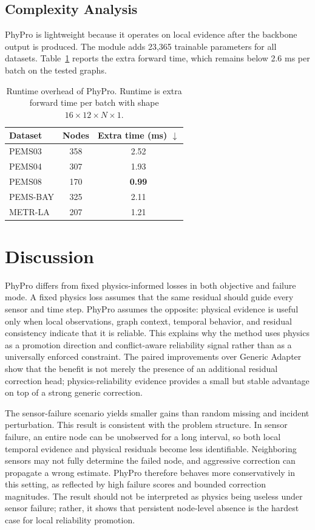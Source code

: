 \documentclass[preprint,12pt]{elsarticle}
\begin{document}
\subsection{Complexity Analysis}
PhyPro is lightweight because it operates on local evidence after the backbone output is produced. The module adds 23,365 trainable parameters for all datasets. Table~\ref{tab:complexity} reports the extra forward time, which remains below 2.6 ms per batch on the tested graphs.

\begin{table}[!htbp]
\centering
\small
\caption{Runtime overhead of PhyPro. Runtime is extra forward time per batch with shape $16{\times}12{\times}N{\times}1$.}
\label{tab:complexity}
\begin{tabular}{lcc}
\toprule
Dataset & Nodes & Extra time (ms) $\downarrow$ \\
\midrule
PEMS03 & 358 & 2.52 \\
PEMS04 & 307 & 1.93 \\
PEMS08 & 170 & \textbf{0.99} \\
PEMS-BAY & 325 & 2.11 \\
METR-LA & 207 & 1.21 \\
\bottomrule
\end{tabular}
\end{table}

\section{Discussion}
PhyPro differs from fixed physics-informed losses in both objective and failure mode. A fixed physics loss assumes that the same residual should guide every sensor and time step. PhyPro assumes the opposite: physical evidence is useful only when local observations, graph context, temporal behavior, and residual consistency indicate that it is reliable. This explains why the method uses physics as a promotion direction and conflict-aware reliability signal rather than as a universally enforced constraint. The paired improvements over Generic Adapter show that the benefit is not merely the presence of an additional residual correction head; physics-reliability evidence provides a small but stable advantage on top of a strong generic correction.

The sensor-failure scenario yields smaller gains than random missing and incident perturbation. This result is consistent with the problem structure. In sensor failure, an entire node can be unobserved for a long interval, so both local temporal evidence and physical residuals become less identifiable. Neighboring sensors may not fully determine the failed node, and aggressive correction can propagate a wrong estimate. PhyPro therefore behaves more conservatively in this setting, as reflected by high failure scores and bounded correction magnitudes. The result should not be interpreted as physics being useless under sensor failure; rather, it shows that persistent node-level absence is the hardest case for local reliability promotion.
\end{document}
